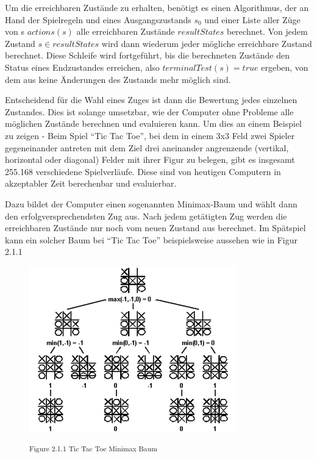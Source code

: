 Um die erreichbaren Zustände zu erhalten, benötigt es einen Algorithmus, der an Hand der Spielregeln und eines Ausgangszustands $s_0$ und einer Liste aller Züge von s $actions(s)$ alle erreichbaren Zustände $resultStates$ berechnet. Von jedem Zustand $s \in resultStates$ wird dann wiederum jeder mögliche erreichbare Zustand berechnet. Diese Schleife wird fortgeführt, bis die berechneten Zustände den Status eines Endzustandes erreichen, also $terminalTest(s) = true$ ergeben, von dem aus keine Änderungen des Zustands mehr möglich sind.

Entscheidend für die Wahl eines Zuges ist dann die Bewertung jedes einzelnen Zustandes. Dies ist solange umsetzbar, wie der Computer ohne Probleme alle möglichen Zustände berechnen und evaluieren kann. Um dies an einem Beispiel zu zeigen - Beim Spiel ``Tic Tac Toe'', bei dem in einem 3x3 Feld zwei Spieler gegeneinander antreten mit dem Ziel drei aneinander angrenzende (vertikal, horizontal oder diagonal) Felder mit ihrer Figur zu belegen, gibt es insgesamt 255.168 verschiedene Spielverläufe. Diese sind von heutigen Computern in akzeptabler Zeit berechenbar und evaluierbar.


Dazu bildet der Computer einen sogenannten Minimax-Baum und wählt dann den erfolgversprechendsten Zug aus. Nach jedem getätigten Zug werden die erreichbaren Zustände nur noch vom neuen Zustand aus berechnet. Im Spätspiel kann ein solcher Baum bei ``Tic Tac Toe'' beispielsweise aussehen wie in Figur 2.1.1

\begin{figure}[h]
\centering
\includegraphics[width=\textwidth/5*3]{images/tictactoe_minimax_tree.png}

\textsuperscript{Figure 2.1.1 Tic Tac Toe Minimax Baum \cite{}}\\
\end{figure}

